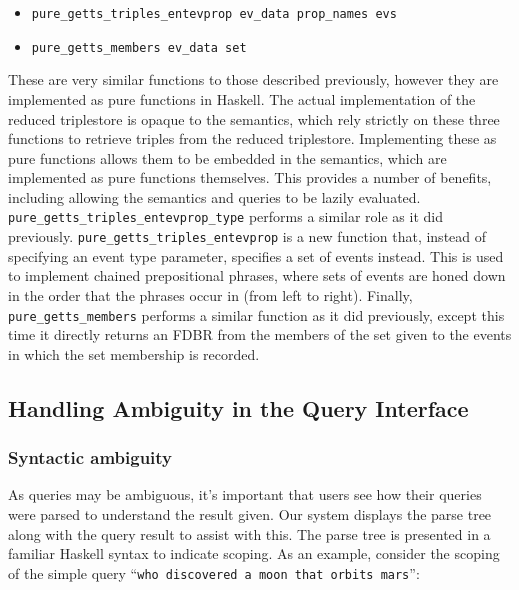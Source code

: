 \documentclass[../main.tex]{subfiles}
\begin{document}
\begin{refsection}
\begin{itemize}
	\item \texttt{pure\_getts\_triples\_entevprop ev\_data prop\_names evs}

	\item \texttt{pure\_getts\_members ev\_data set}
\end{itemize}
These are very similar functions to those described previously, however they are implemented as pure functions in Haskell.  The actual implementation of the reduced triplestore is opaque to the semantics, which rely strictly on these three functions to retrieve triples from the reduced triplestore.  Implementing these as pure functions allows them to be embedded in the semantics, which are implemented as pure functions themselves.  This provides a number of benefits, including allowing the semantics and queries to be lazily evaluated.
\texttt{pure\_getts\_triples\_entevprop\_type} performs a similar role as it did previously. \texttt{pure\_getts\_triples\_entevprop} is a new function that, instead of specifying an event type parameter, specifies a set of events instead.  This is used to implement chained prepositional phrases, where sets of events are honed down in the order that the phrases occur in (from left to right).  Finally, \texttt{pure\_getts\_members} performs a similar function as it did previously, except this time it directly returns an FDBR from the members of the set given to the events in which the set membership is recorded.


\subsection{Handling Ambiguity in the Query Interface}
\label{webist2019journal:ambiguity}

\subsubsection{Syntactic ambiguity}
As queries may be ambiguous, it's important that users see how their queries were parsed to understand the result given.  Our system displays the parse tree along with the query result to assist with this.  The parse tree is presented in a familiar Haskell syntax to indicate scoping.  As an example, consider the scoping of the simple query ``\texttt{who discovered a moon that orbits mars}'':


\end{refsection}
\end{document}
